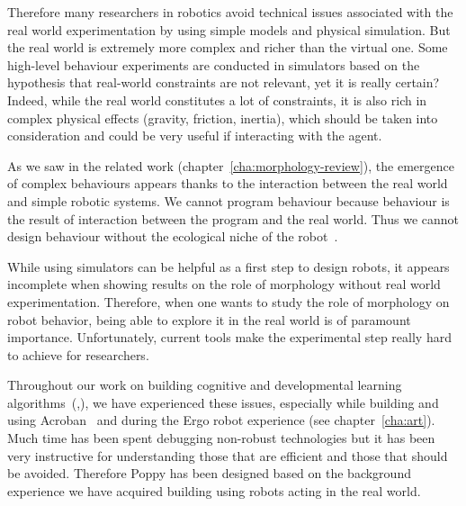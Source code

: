 Therefore many researchers in robotics avoid technical issues associated with the real world experimentation by using simple models and physical simulation. But the real world is extremely more complex and richer than the virtual one.
Some high-level behaviour experiments are conducted in simulators based on the hypothesis that real-world constraints are not relevant, yet it is really certain?
Indeed, while the real world constitutes a lot of constraints, it is also rich in complex physical effects (gravity, friction, inertia), which should be taken into consideration and could be very useful if interacting with the agent.

As we saw in the related work (chapter~\ref{cha:morphology-review}), the emergence of complex behaviours appears thanks to the interaction between the real world and simple robotic systems. We cannot program behaviour because behaviour is the result of interaction  between the program and the real world. Thus we cannot design behaviour without the ecological niche of the robot~\cite{Steels1991emergence}.

While using simulators can be helpful as a first step to design robots, it appears incomplete when showing results on the role of morphology without real world experimentation.
Therefore, when one wants to study the role of morphology on robot behavior, being able to explore it in the real world is of paramount importance. Unfortunately, current tools make the experimental step really hard to achieve for researchers.

Throughout our work on building cognitive and developmental learning algorithms~(\cite{Oudeyer07},\cite{moulin2013exploration}), we have experienced these issues, especially while building and using Acroban~\cite{ly2011bio} and during the Ergo robot experience (see chapter~\ref{cha:art}). Much time has been spent debugging non-robust technologies but it has been very instructive for understanding those that are efficient and those that should be avoided.
Therefore Poppy has been designed based on the background experience we have acquired building using robots acting in the real world.

